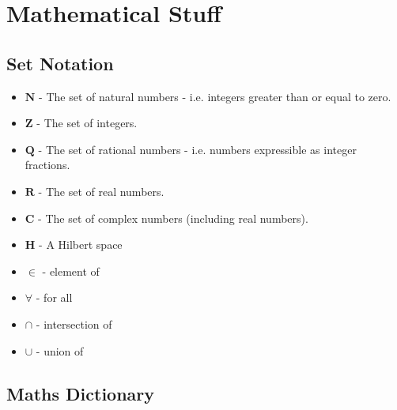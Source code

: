 \chapter{Mathematical Stuff}

	\section{Set Notation}
		
		\begin{itemize}
			\item $\mathbf{N}$ - The set of natural numbers - i.e. integers greater than or equal to zero.
			\item $\mathbf{Z}$ - The set of integers.
			\item $\mathbf{Q}$ - The set of rational numbers - i.e. numbers expressible as integer fractions.
			\item $\mathbf{R}$ - The set of real numbers.
			\item $\mathbf{C}$ - The set of complex numbers (including real numbers).
			\item $\mathbf{H}$ - A Hilbert space
			\item $\in$ - element of
			\item $\forall$ - for all
			\item $\cap$ - intersection of
			\item $\cup$ - union of
		\end{itemize}
		
	\section{Maths Dictionary}
	
